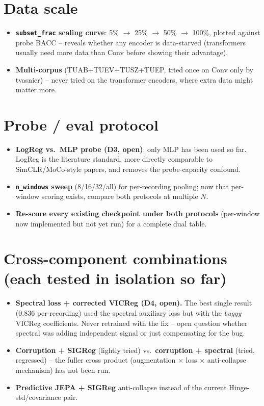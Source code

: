 \documentclass[10pt,a4paper]{article}
\begin{document}
\section{Data scale}
\begin{itemize}
  \item \textbf{\texttt{subset\_frac} scaling curve}: 5\% $\to$ 25\% $\to$ 50\%
  $\to$ 100\%, plotted against probe BACC -- reveals whether any encoder is
  data-starved (transformers usually need more data than Conv before showing their
  advantage).
  \item \textbf{Multi-corpus} (TUAB+TUEV+TUSZ+TUEP, tried once on Conv only by
  tvasnier) -- never tried on the transformer encoders, where extra data might
  matter more.
\end{itemize}

\section{Probe / eval protocol}
\begin{itemize}
  \item \textbf{LogReg vs.\ MLP probe (D3, open)}: only MLP has been used so far.
  LogReg is the literature standard, more directly comparable to SimCLR/MoCo-style
  papers, and removes the probe-capacity confound.
  \item \textbf{\texttt{n\_windows} sweep} (8/16/32/all) for per-recording pooling;
  now that per-window scoring exists, compare both protocols at multiple $N$.
  \item \textbf{Re-score every existing checkpoint under both protocols} (per-window
  now implemented but not yet run) for a complete dual table.
\end{itemize}

\section{Cross-component combinations (each tested in isolation so far)}
\begin{itemize}
  \item \textbf{Spectral loss + corrected VICReg (D4, open).} The best single result
  (0.836 per-recording) used the spectral auxiliary loss but with the
  \emph{buggy} VICReg coefficients. Never retrained with the fix -- open question
  whether spectral was adding independent signal or just compensating for the bug.
  \item \textbf{Corruption + SIGReg} (lightly tried) vs.\ \textbf{corruption +
  spectral} (tried, regressed) -- the fuller cross product (augmentation
  $\times$ loss $\times$ anti-collapse mechanism) has not been run.
  \item \textbf{Predictive JEPA + SIGReg} anti-collapse instead of the current
  Hinge-std/covariance pair.
\end{itemize}
\end{document}
